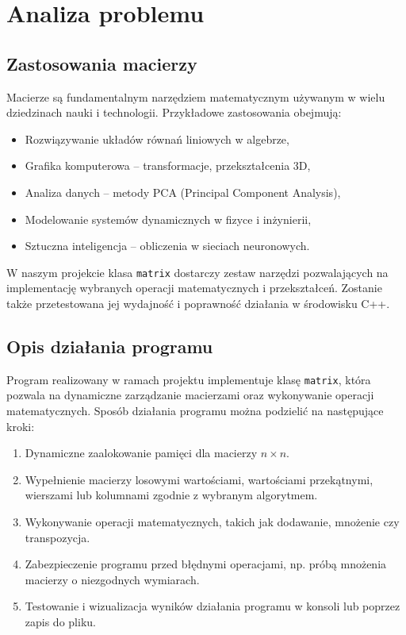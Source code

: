 \newpage
\section{Analiza problemu}		%
\subsection{Zastosowania macierzy}
Macierze są fundamentalnym narzędziem matematycznym używanym w wielu dziedzinach nauki i technologii. Przykładowe zastosowania obejmują:
\begin{itemize}
  \item Rozwiązywanie układów równań liniowych w algebrze,
  \item Grafika komputerowa – transformacje, przekształcenia 3D,
  \item Analiza danych – metody PCA (Principal Component Analysis),
  \item Modelowanie systemów dynamicznych w fizyce i inżynierii,
  \item Sztuczna inteligencja – obliczenia w sieciach neuronowych.
\end{itemize}

W naszym projekcie klasa \texttt{matrix} dostarczy zestaw narzędzi pozwalających na implementację wybranych operacji matematycznych i przekształceń. Zostanie także przetestowana jej wydajność i poprawność działania w środowisku C++.

\subsection{Opis działania programu}
Program realizowany w ramach projektu implementuje klasę \texttt{matrix}, która pozwala na dynamiczne zarządzanie macierzami oraz wykonywanie operacji matematycznych.
Sposób działania programu można podzielić na następujące kroki:
\begin{enumerate}
  \item Dynamiczne zaalokowanie pamięci dla macierzy \( n \times n \).
  \item Wypełnienie macierzy losowymi wartościami, wartościami przekątnymi, wierszami lub kolumnami zgodnie z wybranym algorytmem.
  \item Wykonywanie operacji matematycznych, takich jak dodawanie, mnożenie czy transpozycja.
  \item Zabezpieczenie programu przed błędnymi operacjami, np. próbą mnożenia macierzy o niezgodnych wymiarach.
  \item Testowanie i wizualizacja wyników działania programu w konsoli lub poprzez zapis do pliku.
\end{enumerate}

